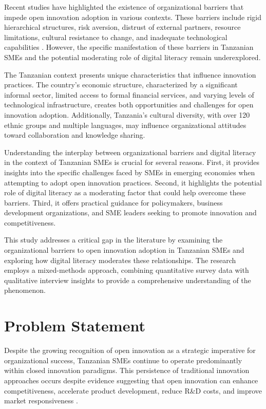 \documentclass[12pt,a4paper]{article}
\begin{document}
Recent studies have highlighted the existence of organizational barriers that impede open innovation adoption in various contexts. These barriers include rigid hierarchical structures, risk aversion, distrust of external partners, resource limitations, cultural resistance to change, and inadequate technological capabilities \cite{gassmann2010open}. However, the specific manifestation of these barriers in Tanzanian SMEs and the potential moderating role of digital literacy remain underexplored.

The Tanzanian context presents unique characteristics that influence innovation practices. The country's economic structure, characterized by a significant informal sector, limited access to formal financial services, and varying levels of technological infrastructure, creates both opportunities and challenges for open innovation adoption. Additionally, Tanzania's cultural diversity, with over 120 ethnic groups and multiple languages, may influence organizational attitudes toward collaboration and knowledge sharing.

Understanding the interplay between organizational barriers and digital literacy in the context of Tanzanian SMEs is crucial for several reasons. First, it provides insights into the specific challenges faced by SMEs in emerging economies when attempting to adopt open innovation practices. Second, it highlights the potential role of digital literacy as a moderating factor that could help overcome these barriers. Third, it offers practical guidance for policymakers, business development organizations, and SME leaders seeking to promote innovation and competitiveness.

This study addresses a critical gap in the literature by examining the organizational barriers to open innovation adoption in Tanzanian SMEs and exploring how digital literacy moderates these relationships. The research employs a mixed-methods approach, combining quantitative survey data with qualitative interview insights to provide a comprehensive understanding of the phenomenon.

\section{Problem Statement}

Despite the growing recognition of open innovation as a strategic imperative for organizational success, Tanzanian SMEs continue to operate predominantly within closed innovation paradigms. This persistence of traditional innovation approaches occurs despite evidence suggesting that open innovation can enhance competitiveness, accelerate product development, reduce R\&D costs, and improve market responsiveness \cite{west2014open}.
\end{document}
